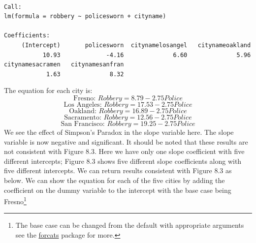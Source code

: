 \documentclass[]{book}
\newenvironment{Shaded}{\begin{snugshade}}{\end{snugshade}}
\newcommand{\CommentTok}[1]{\textcolor[rgb]{0.56,0.35,0.01}{\textit{#1}}}
\newcommand{\DataTypeTok}[1]{\textcolor[rgb]{0.13,0.29,0.53}{#1}}
\newcommand{\DecValTok}[1]{\textcolor[rgb]{0.00,0.00,0.81}{#1}}
\newcommand{\KeywordTok}[1]{\textcolor[rgb]{0.13,0.29,0.53}{\textbf{#1}}}
\newcommand{\NormalTok}[1]{#1}
\newcommand{\OperatorTok}[1]{\textcolor[rgb]{0.81,0.36,0.00}{\textbf{#1}}}
\newcommand{\StringTok}[1]{\textcolor[rgb]{0.31,0.60,0.02}{#1}}
\let\rmarkdownfootnote\footnote%
\def\footnote{\protect\rmarkdownfootnote}
\begin{document}
\begin{verbatim}

Call:
lm(formula = robbery ~ policesworn + cityname)

Coefficients:
     (Intercept)       policesworn  citynamelosangel   citynameoakland  
           10.93             -4.16              6.60              5.96  
citynamesacramen   citynamesanfran  
            1.63              8.32  
\end{verbatim}

The equation for each city is:
\[\text{Fresno: }Robbery = 8.79-2.75Police\]
\[\text{Los Angeles: }Robbery = 17.53-2.75Police\]
\[\text{Oakland: }Robbery = 16.89-2.75Police\]
\[\text{Sacramento: }Robbery = 12.56-2.75Police\]
\[\text{San Francisco: }Robbery = 19.25-2.75Police\]
We see the effect of Simpson's Paradox in the slope variable here. The slope variable is now negative and significant. It should be noted that these results are not consistent with Figure 8.3. Here we have only one slope coefficient with five different intercepts; Figure 8.3 shows five different slope coefficients along with five different intercepts. We can return results consistent with Figure 8.3 as below. We can show the equation for each of the five cities by adding the coefficient on the dummy variable to the intercept with the base case being Fresno\footnote{The base case can be changed from the default with appropriate arguments see the \href{https://forcats.tidyverse.org/}{forcats} package for more.}

\begin{Shaded}
\end{Shaded}
\end{document}
